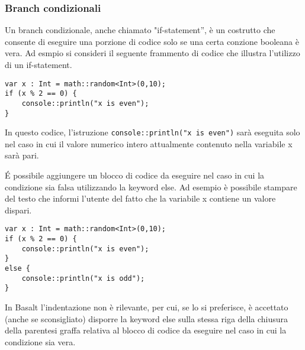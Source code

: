 \subsubsection{Branch condizionali}
Un branch condizionale, anche chiamato "if-statement”, è un costrutto che consente di eseguire una porzione di codice solo se una certa conzione booleana è vera. Ad esmpio si consideri 
il seguente frammento di codice che illustra l’utilizzo di un if-statement.


\vspace{0.5cm}

\begin{lstlisting}[frame=single]
var x : Int = math::random<Int>(0,10);
if (x % 2 == 0) {
    console::println("x is even");
}
\end{lstlisting}


\vspace{0.5cm}

In questo codice, l’istruzione \texttt{console::println("x is even")} sarà eseguita solo nel caso in cui il valore numerico intero attualmente contenuto nella variabile x sarà pari. 

É possibile aggiungere un blocco di codice da eseguire nel caso in cui la condizione sia falsa utilizzando la keyword else. Ad esempio è possibile stampare del testo che 
informi l’utente del fatto che la variabile x contiene un valore dispari.

\vspace{0.5cm}

\begin{lstlisting}[frame=single]
var x : Int = math::random<Int>(0,10);
if (x % 2 == 0) {
    console::println("x is even");
}
else {
    console::println("x is odd");
}    
\end{lstlisting}


\vspace{0.5cm}

In Basalt l’indentazione non è rilevante, per cui, se lo si preferisce, è accettato (anche se sconsigliato) disporre la keyword else sulla stessa riga della 
chiusura della parentesi graffa relativa al blocco di codice da eseguire nel caso in cui la condizione sia vera.